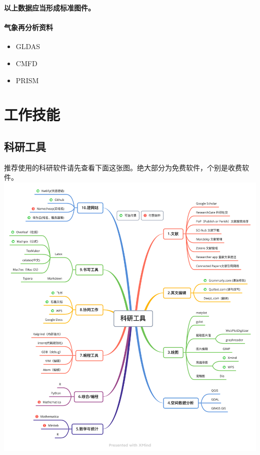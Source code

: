 \documentclass[
]{ctexbook}
\providecommand{\tightlist}{%
  \setlength{\itemsep}{0pt}\setlength{\parskip}{0pt}}
\begin{document}
\textbf{以上数据应当形成标准图件。}

\hypertarget{ux6c14ux8c61ux518dux5206ux6790ux8d44ux6599}{%
\subsubsection{气象再分析资料}\label{ux6c14ux8c61ux518dux5206ux6790ux8d44ux6599}}

\begin{itemize}
\tightlist
\item
  GLDAS
\item
  CMFD
\item
  PRISM
\end{itemize}

\hypertarget{skill}{%
\chapter{工作技能}\label{skill}}

\hypertarget{researchtool}{%
\section{科研工具}\label{researchtool}}

推荐使用的科研软件请先查看下面这张图。绝大部分为免费软件，个别是收费软件。
\includegraphics{Fig/tools.png}
\end{document}
